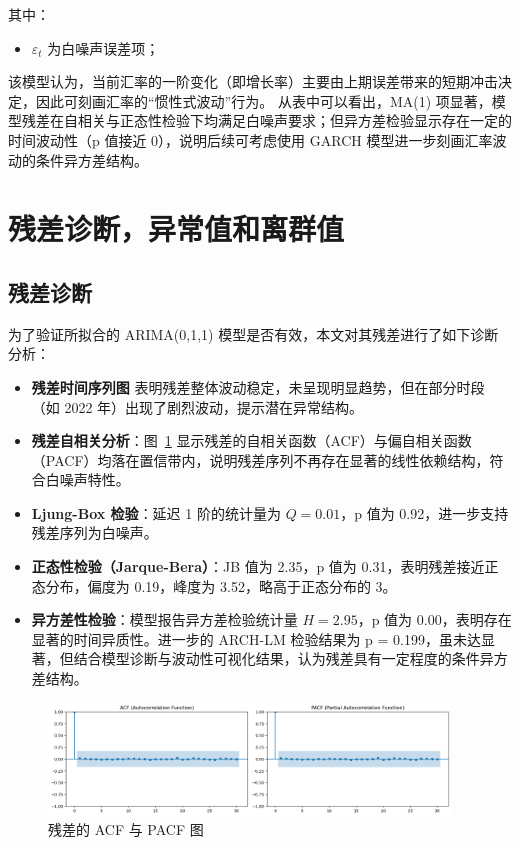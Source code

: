 \documentclass[11pt,a4paper]{article}
\begin{document}
其中：
\begin{itemize}
  \item $\varepsilon_t$ 为白噪声误差项；
\end{itemize}

该模型认为，当前汇率的一阶变化（即增长率）主要由上期误差带来的短期冲击决定，因此可刻画汇率的“惯性式波动”行为。
从表中可以看出，MA(1) 项显著，模型残差在自相关与正态性检验下均满足白噪声要求；但异方差检验显示存在一定的时间波动性（p 值接近 0），说明后续可考虑使用 GARCH 模型进一步刻画汇率波动的条件异方差结构。



\section{残差诊断，异常值和离群值}

\subsection{残差诊断}

为了验证所拟合的 ARIMA(0,1,1) 模型是否有效，本文对其残差进行了如下诊断分析：

\begin{itemize}
  \item \textbf{残差时间序列图} 表明残差整体波动稳定，未呈现明显趋势，但在部分时段（如 2022 年）出现了剧烈波动，提示潜在异常结构。
  
  \item \textbf{残差自相关分析}：图~\ref{fig:acf-resid} 显示残差的自相关函数（ACF）与偏自相关函数（PACF）均落在置信带内，说明残差序列不再存在显著的线性依赖结构，符合白噪声特性。

  \item \textbf{Ljung-Box 检验}：延迟 1 阶的统计量为 $Q = 0.01$，p 值为 0.92，进一步支持残差序列为白噪声。

  \item \textbf{正态性检验（Jarque-Bera）}：JB 值为 2.35，p 值为 0.31，表明残差接近正态分布，偏度为 0.19，峰度为 3.52，略高于正态分布的 3。

  \item \textbf{异方差性检验}：模型报告异方差检验统计量 $H = 2.95$，p 值为 0.00，表明存在显著的时间异质性。进一步的 ARCH-LM 检验结果为 p = 0.199，虽未达显著，但结合模型诊断与波动性可视化结果，认为残差具有一定程度的条件异方差结构。
\end{itemize}

\begin{figure}[H]
  \centering
  \includegraphics[width=0.95\textwidth]{./figures/acf_pacf_residual.png}
  \caption{残差的 ACF 与 PACF 图}
  \label{fig:acf-resid}
\end{figure}
\end{document}
